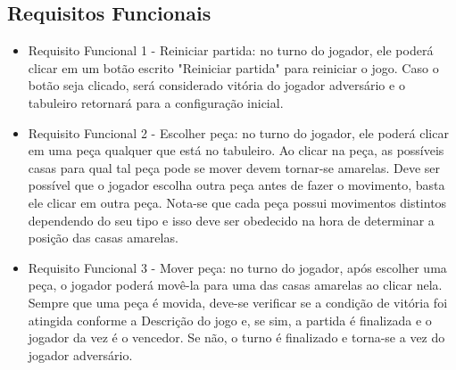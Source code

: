 \documentclass{article}
\begin{document}
\subsection{Requisitos Funcionais}
    \begin{itemize}
    
        \item Requisito Funcional 1 - Reiniciar partida: no turno do jogador, ele poderá clicar em um botão escrito "Reiniciar partida" para reiniciar o jogo. Caso o botão seja clicado, será considerado vitória do jogador adversário e o tabuleiro retornará para a configuração inicial.
        
        \item Requisito Funcional 2 - Escolher peça: no turno do jogador, ele poderá clicar em uma peça qualquer que está no tabuleiro. Ao clicar na peça, as possíveis casas para qual tal peça pode se mover devem tornar-se amarelas. Deve ser possível que o jogador escolha outra peça antes de fazer o movimento, basta ele clicar em outra peça.
        Nota-se que cada peça possui movimentos distintos dependendo do seu tipo e isso deve ser obedecido na hora de determinar a posição das casas amarelas.
        
        \item Requisito Funcional 3 - Mover peça: no turno do jogador, após escolher uma peça, o jogador poderá movê-la para uma das casas amarelas ao clicar nela. Sempre que uma peça é movida, deve-se verificar se a condição de vitória foi atingida conforme a Descrição do jogo e, se sim, a partida é finalizada e o jogador da vez é o vencedor. Se não, o turno é finalizado e torna-se a vez do jogador adversário.
        
    \end{itemize}
\end{document}
